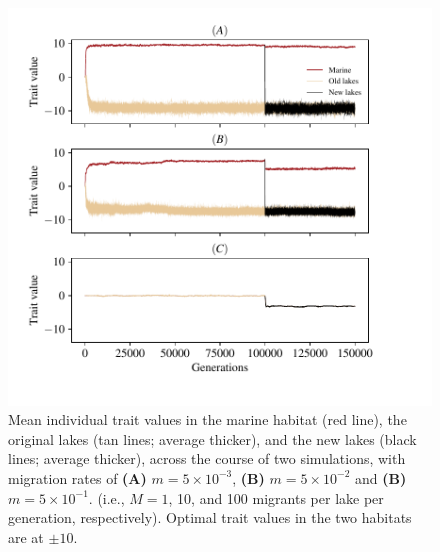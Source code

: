 \documentclass{article}
\begin{document}
\begin{figure}
    \begin{center}
          \includegraphics[width=1.0\linewidth]{Final_Plots/Pheno_Time_supp.pdf}
          \caption{
        Mean individual trait values in the marine habitat (red line),
                the original lakes (tan lines; average thicker),
                and the new lakes (black lines; average thicker),
                across the course of two simulations, with migration rates of
                \textbf{(A)} $m=5 \times 10^{-3}$,
                \textbf{(B)} $m=5 \times 10^{-2}$ and
        \textbf{(B)} $m=5 \times 10^{-1}$.
                (i.e., $M=1$, 10, and 100 migrants per lake per generation, respectively).
                Optimal trait values in the two habitats are at $\pm 10$.
        }
          \label{fig:phenotype_time_supp}
    \end{center}
\end{figure}
\end{document}
